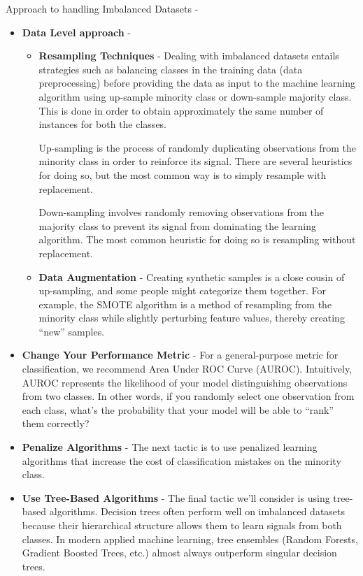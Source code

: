 \documentclass{book}
\begin{document}
Approach to handling Imbalanced Datasets -
\begin{itemize}
\item \textbf{Data Level approach} - 
\begin{itemize}
\item \textbf{Resampling Techniques} - Dealing with imbalanced datasets entails strategies such as balancing classes in the training data (data preprocessing) before providing the data as input to the machine learning algorithm using up-sample minority class or down-sample majority class. This is done in order to obtain approximately the same number of instances for both the classes.

Up-sampling is the process of randomly duplicating observations from the minority class in order to reinforce its signal.
There are several heuristics for doing so, but the most common way is to simply resample with replacement.

Down-sampling involves randomly removing observations from the majority class to prevent its signal from dominating the learning algorithm.
The most common heuristic for doing so is resampling without replacement.
\item \textbf{Data Augmentation} - Creating synthetic samples is a close cousin of up-sampling, and some people might categorize them together. For example, the SMOTE algorithm is a method of resampling from the minority class while slightly perturbing feature values, thereby creating ``new'' samples.
\end{itemize}

\item \textbf{Change Your Performance Metric} - For a general-purpose metric for classification, we recommend Area Under ROC Curve (AUROC).
Intuitively, AUROC represents the likelihood of your model distinguishing observations from two classes. In other words, if you randomly select one observation from each class, what's the probability that your model will be able to ``rank'' them correctly?
\item \textbf{Penalize Algorithms} - The next tactic is to use penalized learning algorithms that increase the cost of classification mistakes on the minority class.
\item \textbf{Use Tree-Based Algorithms} - The final tactic we'll consider is using tree-based algorithms. Decision trees often perform well on imbalanced datasets because their hierarchical structure allows them to learn signals from both classes.
In modern applied machine learning, tree ensembles (Random Forests, Gradient Boosted Trees, etc.) almost always outperform singular decision trees. 


\end{itemize}
\end{document}
